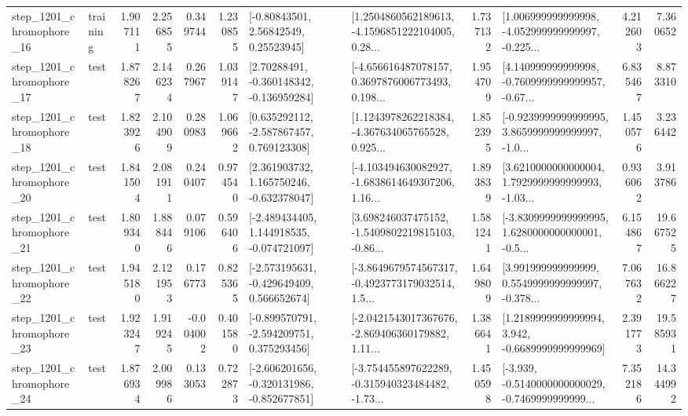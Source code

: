 \begin{tabular}{llrrrrllrlrr}
 step\_1201\_chromophore\_16 &  training &      1.907111 &    2.256855 &      0.349744 &  1.230855 &       [-0.80843501, 2.56842549, 0.25523945] &  [1.2504860562189613, -4.1596851222104005, 0.28... &       1.737132 &  [1.006999999999998, -4.052999999999997, -0.225... &            4.212603 &          7.360652 \\
 step\_1201\_chromophore\_17 &      test &      1.878267 &    2.146234 &      0.267967 &  1.039147 &    [2.70288491, -0.360148342, -0.136959284] &  [-4.656616487078157, 0.3697876006773493, 0.198... &       1.954709 &  [4.140999999999998, -0.7609999999999957, -0.67... &            6.835467 &          8.873310 \\
 step\_1201\_chromophore\_18 &      test &      1.823926 &    2.104909 &      0.280983 &  1.069662 &    [0.635292112, -2.587867457, 0.769123308] &  [1.1243978262218384, -4.367634065765528, 0.925... &       1.852395 &  [-0.9239999999999995, 3.8659999999999997, -1.0... &            1.450576 &          3.236442 \\
 step\_1201\_chromophore\_20 &      test &      1.841504 &    2.081911 &      0.240407 &  0.974540 &    [2.361903732, 1.165750246, -0.632378047] &  [-4.103494630082927, -1.6838614649307206, 1.16... &       1.893839 &  [3.6210000000000004, 1.7929999999999993, -1.03... &            0.936062 &          3.913786 \\
 step\_1201\_chromophore\_21 &      test &      1.809340 &    1.888446 &      0.079106 &  0.596406 &   [-2.489434405, 1.144918535, -0.074721097] &  [3.698246037475152, -1.5409802219815103, -0.86... &       1.581241 &  [-3.8309999999999995, 1.6280000000000001, -0.5... &            6.154867 &         19.667525 \\
 step\_1201\_chromophore\_22 &      test &      1.945180 &    2.121953 &      0.176773 &  0.825365 &   [-2.573195631, -0.429649409, 0.566652674] &  [-3.8649679574567317, -0.4923773179032514, 1.5... &       1.649809 &  [3.991999999999999, 0.5549999999999997, -0.378... &            7.067632 &         16.866227 \\
 step\_1201\_chromophore\_23 &      test &      1.923247 &    1.919245 &     -0.004002 &  0.401580 &   [-0.899570791, -2.594209751, 0.375293456] &  [-2.0421543017367676, -2.869406360179882, 1.11... &       1.386641 &   [1.2189999999999994, 3.942, -0.6689999999999969] &            2.391773 &         19.585931 \\
 step\_1201\_chromophore\_24 &      test &      1.876934 &    2.009986 &      0.133053 &  0.722873 &  [-2.606201656, -0.320131986, -0.852677851] &  [-3.754455897622289, -0.315940323484482, -1.73... &       1.450598 &  [-3.939, -0.5140000000000029, -0.7469999999999... &            7.352186 &         14.344992 \\

\end{tabular}
